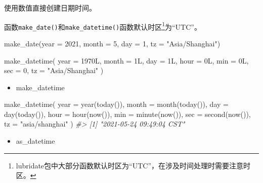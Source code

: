 \documentclass[
]{book}
\newenvironment{Shaded}{\begin{snugshade}}{\end{snugshade}}
\newcommand{\AttributeTok}[1]{\textcolor[rgb]{0.77,0.63,0.00}{#1}}
\newcommand{\CommentTok}[1]{\textcolor[rgb]{0.56,0.35,0.01}{\textit{#1}}}
\newcommand{\DecValTok}[1]{\textcolor[rgb]{0.00,0.00,0.81}{#1}}
\newcommand{\FunctionTok}[1]{\textcolor[rgb]{0.00,0.00,0.00}{#1}}
\newcommand{\NormalTok}[1]{#1}
\newcommand{\StringTok}[1]{\textcolor[rgb]{0.31,0.60,0.02}{#1}}
\providecommand{\tightlist}{%
  \setlength{\itemsep}{0pt}\setlength{\parskip}{0pt}}
\begin{document}
使用数值直接创建日期时间。

函数\texttt{make\_date()}和\texttt{make\_datetime()}函数默认时区\footnote{lubridate包中大部分函数默认时区为``UTC''，在涉及时间处理时需要注意时区。}为``UTC''。

\begin{Shaded}
\begin{Highlighting}[]
\FunctionTok{make\_date}\NormalTok{(}\AttributeTok{year =} \DecValTok{2021}\NormalTok{, }\AttributeTok{month =} \DecValTok{5}\NormalTok{, }\AttributeTok{day =} \DecValTok{1}\NormalTok{, }\AttributeTok{tz =} \StringTok{"Asia/Shanghai"}\NormalTok{)}

\FunctionTok{make\_datetime}\NormalTok{(}
  \AttributeTok{year =}\NormalTok{ 1970L,}
  \AttributeTok{month =}\NormalTok{ 1L,}
  \AttributeTok{day =}\NormalTok{ 1L,}
  \AttributeTok{hour =}\NormalTok{ 0L,}
  \AttributeTok{min =}\NormalTok{ 0L,}
  \AttributeTok{sec =} \DecValTok{0}\NormalTok{,}
  \AttributeTok{tz =} \StringTok{"Asia/Shanghai"}
\NormalTok{)}
\end{Highlighting}
\end{Shaded}

\begin{itemize}
\tightlist
\item
  make\_datetime
\end{itemize}

\begin{Shaded}
\begin{Highlighting}[]
\FunctionTok{make\_datetime}\NormalTok{(}
  \AttributeTok{year =} \FunctionTok{year}\NormalTok{(}\FunctionTok{today}\NormalTok{()),}
  \AttributeTok{month =} \FunctionTok{month}\NormalTok{(}\FunctionTok{today}\NormalTok{()),}
  \AttributeTok{day =} \FunctionTok{day}\NormalTok{(}\FunctionTok{today}\NormalTok{()),}
  \AttributeTok{hour =} \FunctionTok{hour}\NormalTok{(}\FunctionTok{now}\NormalTok{()),}
  \AttributeTok{min =} \FunctionTok{minute}\NormalTok{(}\FunctionTok{now}\NormalTok{()),}
  \AttributeTok{sec =} \FunctionTok{second}\NormalTok{(}\FunctionTok{now}\NormalTok{()),}
  \AttributeTok{tz =} \StringTok{"asia/shanghai"}
\NormalTok{)}
\CommentTok{\#\textgreater{} [1] "2021{-}05{-}24 09:49:04 CST"}
\end{Highlighting}
\end{Shaded}

\begin{itemize}
\tightlist
\item
  as\_datetime
\end{itemize}
\end{document}
